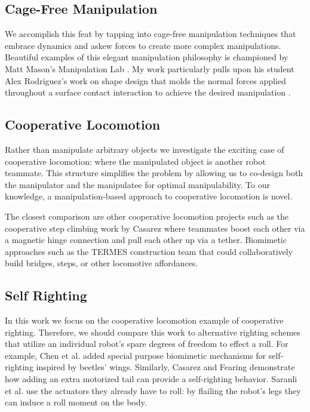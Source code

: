 \documentclass[letterpaper]{report}
\begin{document}
\subsection{Cage-Free Manipulation}
We accomplish this feat by tapping into cage-free manipulation techniques that embrace dynamics and askew forces to create more complex manipulations.
Beautiful examples of this elegant manipulation philosophy is championed by Matt Mason's Manipulation Lab \cite{lynch1999dynamic}\cite{dafle2014extrinsic}.
My work particularly pulls upon his student Alex Rodriguez's work on shape design that molds the normal forces applied throughout a surface contact interaction to achieve the desired manipulation \cite{rodriguez2013effector}.

\subsection{Cooperative Locomotion}
Rather than manipulate arbitrary objects we investigate the exciting case of cooperative locomotion: where the manipulated object is another robot teammate.
This structure simplifies the problem by allowing us to co-design both the manipulator and the manipulatee for optimal manipulability.
To our knowledge, a manipulation-based approach to cooperative locomotion is novel.

The closest comparison are other cooperative locomotion projects such as the cooperative step climbing work by Casarez \cite{casarez2016step} where teammates boost each other via a magnetic hinge connection and pull each other up via a tether.
Biomimetic approaches such as the TERMES \cite{werfel2014designing} construction team that could collaboratively build bridges, steps, or other locomotive affordances.

\subsection{Self Righting}
In this work we focus on the cooperative locomotion example of cooperative righting.
Therefore, we should compare this work to alternative righting schemes that utilize an individual robot's spare degrees of freedom to effect a roll.
For example, Chen et al. \cite{li2016cockroach} added special purpose biomimetic mechanisms for self-righting inspired by beetles' wings.
Similarly, Casarez and Fearing \cite{casarezTailRighting} demonstrate how adding an extra motorized tail can provide a self-righting behavior.
Saranli et al. \cite{saranli2004model} use the actuators they already have to roll: by flailing the robot's legs they can induce a roll moment on the body.
\end{document}
